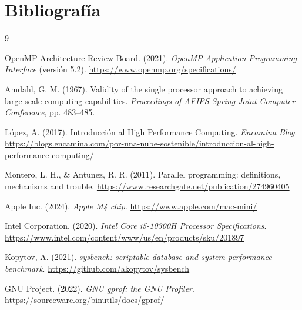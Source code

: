 \documentclass{article}
\begin{document}
\newpage
\section{Bibliografía}

\begin{thebibliography}{9}

    OpenMP Architecture Review Board. (2021).
    \textit{OpenMP Application Programming Interface} (versión 5.2).
    \url{https://www.openmp.org/specifications/}

    Amdahl, G. M. (1967).
    Validity of the single processor approach to achieving large scale computing capabilities.
    \textit{Proceedings of AFIPS Spring Joint Computer Conference}, pp. 483--485.

    López, A. (2017).
    Introducción al High Performance Computing.
    \textit{Encamina Blog}.
    \url{https://blogs.encamina.com/por-una-nube-sostenible/introduccion-al-high-performance-computing/}

    Montero, L. H., \& Antunez, R. R. (2011).
    Parallel programming: definitions, mechanisms and trouble.
    \url{https://www.researchgate.net/publication/274960405}

    Apple Inc. (2024).
    \textit{Apple M4 chip}.
    \url{https://www.apple.com/mac-mini/}

    Intel Corporation. (2020).
    \textit{Intel Core i5-10300H Processor Specifications}.
    \url{https://www.intel.com/content/www/us/en/products/sku/201897}

    Kopytov, A. (2021).
    \textit{sysbench: scriptable database and system performance benchmark}.
    \url{https://github.com/akopytov/sysbench}

    GNU Project. (2022).
    \textit{GNU gprof: the GNU Profiler}.
    \url{https://sourceware.org/binutils/docs/gprof/}

\end{thebibliography}
\end{document}
